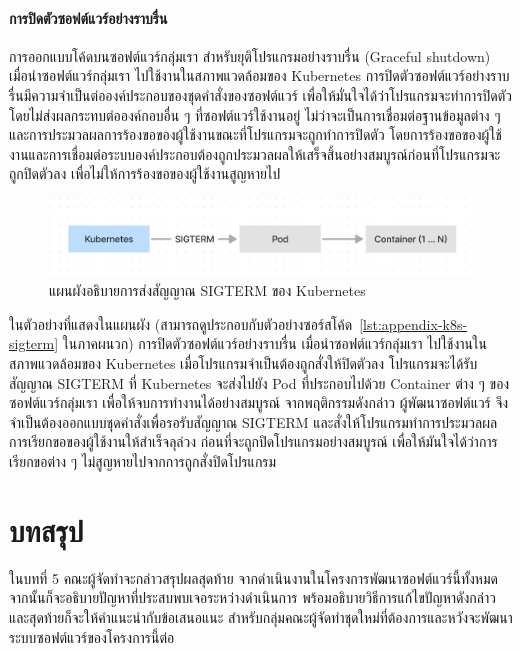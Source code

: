 \documentclass[12pt,one side,openright,a4paper]{cpe-thesis-th}
\newcommand{\thaijustify}[1]{%
  \par\hspace{30pt}\justifying
  #1
}
\begin{document}
        \subsubsection{การปิดตัวซอฟต์แวร์อย่างราบรื่น}
            \thaijustify{
                การออกแบบโค้ดบนซอฟต์แวร์กลุ่มเรา สำหรับยุติโปรแกรมอย่างราบรื่น (Graceful shutdown) เมื่อนำซอฟต์แวร์กลุ่มเรา ไปใช้งานในสภาพแวดล้อมของ Kubernetes การปิดตัวซอฟต์แวร์อย่างราบรื่นมีความจำเป็นต่อองค์ประกอบของชุดคำสั่งของซอฟต์แวร์ เพื่อให้มั่นใจได้ว่าโปรแกรมจะทำการปิดตัวโดยไม่ส่งผลกระทบต่อองค์กอบอื่น ๆ ที่ซอฟต์แวร์ใช้งานอยู่ ไม่ว่าจะเป็นการเชื่อมต่อฐานข้อมูลต่าง ๆ และการประมวลผลการร้องขอของผู้ใช้งานขณะที่โปรแกรมจะถูกทำการปิดตัว โดยการร้องขอของผู้ใช้งานและการเชื่อมต่อระบบองค์ประกอบต้องถูกประมวลผลให้เสร็จสิ้นอย่างสมบูรณ์ก่อนที่โปรแกรมจะถูกปิดตัวลง เพื่อไม่ให้การร้องขอของผู้ใช้งานสูญหายไป
            }
            \begin{figure}[H]
                \centering
                \includegraphics[width=12cm]{figure/results/k8s-sigterm.png}
                \caption[แผนผังอธิบายการส่งสัญญาณ SIGTERM ของ Kubernetes]{แผนผังอธิบายการส่งสัญญาณ SIGTERM ของ Kubernetes}
                \label{fig:res-k8s-sigterm}
            \end{figure}
            \thaijustify{
                ในตัวอย่างที่แสดงในแผนผัง (สามารถดูประกอบกับตัวอย่างซอร์สโค้ด~\ref{lst:appendix-k8s-sigterm} ในภาคผนวก) การปิดตัวซอฟต์แวร์อย่างราบรื่น เมื่อนำซอฟต์แวร์กลุ่มเรา ไปใช้งานในสภาพแวดล้อมของ Kubernetes เมื่อโปรแกรมจำเป็นต้องถูกสั่งให้ปิดตัวลง โปรแกรมจะได้รับสัญญาณ SIGTERM ที่ Kubernetes จะส่งไปยัง Pod ที่ประกอบไปด้วย Container ต่าง ๆ ของซอฟต์แวร์กลุ่มเรา เพื่อให้จบการทำงานได้อย่างสมบูรณ์ จากพฤติกรรมดังกล่าว ผู้พัฒนาซอฟต์แวร์ จึงจำเป็นต้องออกแบบชุดคำสั่งเพื่อรอรับสัญญาณ SIGTERM และสั่งให้โปรแกรมทำการประมวลผลการเรียกขอของผู้ใช้งานให้สำเร็จลุล่วง ก่อนที่จะถูกปิดโปรแกรมอย่างสมบูรณ์ เพื่อให้มันใจได้ว่าการเรียกขอต่าง ๆ ไม่สูญหายไปจากการถูกสั่งปิดโปรแกรม
            }

\chapter{บทสรุป}
    ในบทที่ 5 คณะผู้จัดทำจะกล่าวสรุปผลสุดท้าย จากดำเนินงานในโครงการพัฒนาซอฟต์แวร์นี้ทั้งหมด จากนั้นก็จะอธิบายปัญหาที่ประสบพบเจอระหว่างดำเนินการ พร้อมอธิบายวิธีการแก้ไขปัญหาดังกล่าว และสุดท้ายก็จะให้คำแนะนำกับข้อเสนอแนะ สำหรับกลุ่มคณะผู้จัดทำชุดใหม่ที่ต้องการและหวังจะพัฒนาระบบซอฟต์แวร์ของโครงการนี้ต่อ
\end{document}
